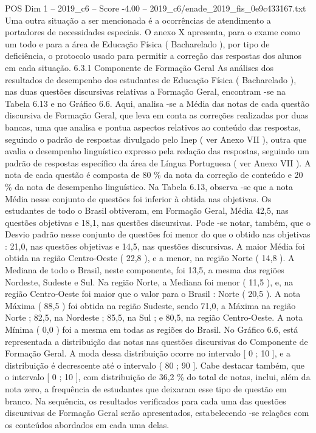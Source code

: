 \begin{textsample}{POS Dim 1 – 2019\_c6 – Score -4.00 – 2019\_c6/enade\_2019\_fis\_0e9c433167.txt}
Uma outra situação a ser mencionada é a ocorrências de atendimento a portadores de necessidades especiais.
O anexo X apresenta, para o exame como um todo e para a área de Educação Física ( Bacharelado ), por tipo de deficiência, o protocolo usado para permitir a correção das respostas dos alunos em cada situação. 6.3.1 Componente de Formação Geral As análises dos resultados de desempenho dos estudantes de Educação Física ( Bacharelado ), nas duas questões discursivas relativas a Formação Geral, encontram -se na Tabela 6.13 e no Gráfico 6.6.
Aqui, analisa -se a Média das notas de cada questão discursiva de Formação Geral, que leva em conta as correções realizadas por duas bancas, uma que analisa e pontua aspectos relativos ao conteúdo das respostas, seguindo o padrão de respostas divulgado pelo Inep ( ver Anexo VII ), outra que avalia o desempenho linguístico expresso pela redação das respostas, seguindo um padrão de respostas específico da área de Língua Portuguesa ( ver Anexo VII ).
A nota de cada questão é composta de 80 \% da nota da correção de conteúdo e 20 \% da nota de desempenho linguístico.
Na Tabela 6.13, observa -se que a nota Média nesse conjunto de questões foi inferior à obtida nas objetivas.
Os estudantes de todo o Brasil obtiveram, em Formação Geral, Média 42,5, nas questões objetivas e 18,1, nas questões discursivas.
Pode -se notar, também, que o Desvio padrão nesse conjunto de questões foi menor do que o obtido nas objetivas : 21,0, nas questões objetivas e 14,5, nas questões discursivas.
A maior Média foi obtida na região Centro-Oeste ( 22,8 ), e a menor, na região Norte ( 14,8 ).
A Mediana de todo o Brasil, neste componente, foi 13,5, a mesma das regiões Nordeste, Sudeste e Sul.
Na região Norte, a Mediana foi menor ( 11,5 ), e, na região Centro-Oeste foi maior que o valor para o Brasil : Norte ( 20,5 ).
A nota Máxima ( 88,5 ) foi obtida na região Sudeste, sendo 71,0, a Máxima na região Norte ; 82,5, na Nordeste ; 85,5, na Sul ; e 80,5, na região Centro-Oeste.
A nota Mínima ( 0,0 ) foi a mesma em todas as regiões do Brasil.
No Gráfico 6.6, está representada a distribuição das notas nas questões discursivas do Componente de Formação Geral.
A moda dessa distribuição ocorre no intervalo [ 0 ; 10 ], e a distribuição é decrescente até o intervalo ( 80 ; 90 ].
Cabe destacar também, que o intervalo [ 0 ; 10 ], com distribuição de 36,2 \% do total de notas, inclui, além da nota zero, a frequência de estudantes que deixaram esse tipo de questão em branco.
Na sequência, os resultados verificados para cada uma das questões discursivas de Formação Geral serão apresentados, estabelecendo -se relações com os conteúdos abordados em cada uma delas.

\end{textsample}
